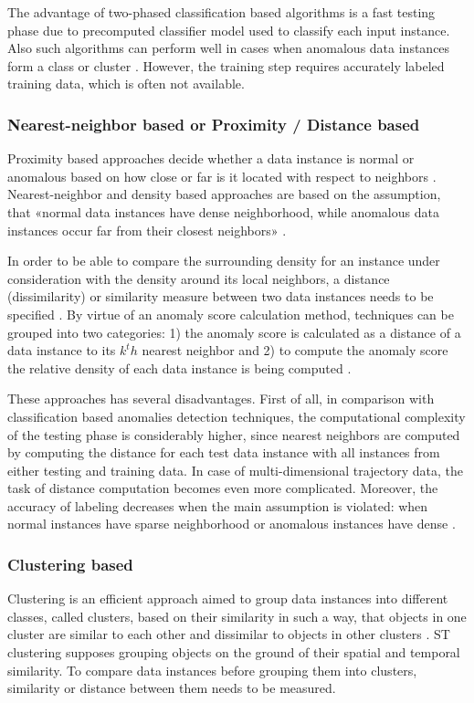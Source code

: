 The advantage of two-phased classification based algorithms is a fast testing phase due to precomputed classifier model used to classify each input instance. Also such algorithms can perform well in cases when anomalous data instances form a class or cluster \cite{inproceedings:18_ardod_lstd}. However, the training step requires accurately labeled training data, which is often not available. 

\subsubsection{Nearest-neighbor based \cite{article:15_survey_ad} or Proximity / Distance based \cite{article:6_survey_anom_det_rtuvs}\cite{inproceedings:18_ardod_lstd}}
Proximity based approaches decide whether a data instance is normal or anomalous based on how close or far is it located with respect to neighbors \cite{article:6_survey_anom_det_rtuvs}. Nearest-neighbor and density based approaches are based on the assumption, that «normal data instances have dense neighborhood, while anomalous data instances occur far from their closest neighbors» \cite{article:15_survey_ad}.

In order to be able to compare the surrounding density for an instance under consideration with the density around its local neighbors, a distance (dissimilarity) or similarity measure between two data instances needs to be specified \cite{inproceedings:18_ardod_lstd}. By virtue of an anomaly score calculation method, techniques can be grouped into two categories: 1) the anomaly score is calculated as a distance of a data instance to its $k^th$ nearest neighbor and 2) to compute the anomaly score the relative density of each data instance is being computed \cite{article:15_survey_ad}.

These approaches has several disadvantages. First of all, in comparison with classification based anomalies detection techniques, the computational complexity of the testing phase is considerably higher, since nearest neighbors are computed by computing the distance for each test data instance with all instances from either testing and training data. In case of multi-dimensional trajectory data, the task of distance computation becomes even more complicated. Moreover, the accuracy of labeling decreases when the main assumption is violated: when normal instances have sparse neighborhood or anomalous instances have dense \cite{article:15_survey_ad}.

\subsubsection{Clustering based}
Clustering is an efficient approach aimed to group data instances into different classes, called clusters, based on their similarity in such a way, that objects in one cluster are similar to each other and dissimilar to objects in other clusters \cite{article:8_review_mot_cl_alg}\cite{article:22_survey_dscc}. ST clustering supposes grouping objects on the ground of their spatial and temporal similarity. To compare data instances before grouping them into clusters, similarity or distance between them needs to be measured.

